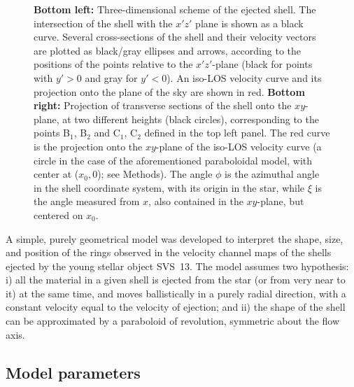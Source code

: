\documentclass[12pt]{mythesis}
\begin{document}
\begin{figure}[p!]
 {\bf Bottom left:} Three-dimensional scheme of the ejected shell. The intersection of the shell with the $x'z'$ plane is shown as a black curve. Several cross-sections of the shell and their velocity vectors are plotted as black/gray ellipses and arrows, according to the positions of the points relative to the $x'z'$-plane (black for points with $y'$$>$0 and gray for $y'$$<$0). An iso-LOS velocity curve and its projection onto the plane of the sky are shown in red.  
 {\bf Bottom right:} Projection of transverse sections of the shell onto the $xy$-plane, at two different heights (black circles), corresponding to the points B$_1$, B$_2$ and C$_1$, C$_2$ defined in the top left panel. The red curve is the projection onto the $xy$-plane of the iso-LOS velocity curve (a circle in the case of the aforementioned paraboloidal model, with center at ($x_0,0$); see Methods). The angle $\phi$ is the azimuthal angle in the shell coordinate system, with its origin in the star, while $\xi$ is the angle measured from $x$, also contained in the $xy$-plane, but centered on $x_0$.
\end{figure}



A simple, purely geometrical model was developed to interpret the shape, size, and position of the rings observed in the velocity channel maps of the shells ejected by the young stellar object SVS~13.
The model assumes two hypothesis: 
i) all the material in a given shell is ejected from the star (or from very near to it) at the same time, and moves ballistically in a purely radial direction,
with a constant velocity equal to the velocity of ejection; and ii) the shape of the shell can be approximated by a paraboloid of revolution, symmetric about the flow axis.

\subsection{Model parameters}
\end{document}
